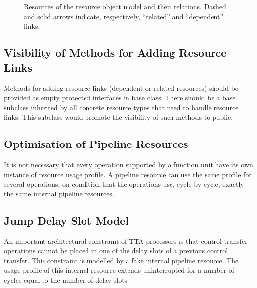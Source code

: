 \documentclass[a4paper,twoside]{tce}
\begin{document}
\begin{figure}[tb]
\centerline{}
\caption{Resources of the resource object model and their relations. Dashed
  and solid arrows indicate, respectively, ``related'' and ``dependent''
  links.}
  \label{fig:resource-graph}
\end{figure}


\subsection{Visibility of Methods for Adding Resource Links}

Methods for adding resource links (dependent or related resources) should be
provided as empty protected interfaces in base class. There should
be
%
%
a base subclass inherited by all concrete resource types that need to handle
resource links. This subclass would promote the visibility of such methods
to public.

\subsection{Optimisation of Pipeline Resources}

It is not necessary that every operation supported by a function unit have
its own instance of resource usage profile. A pipeline resource can use the
same profile for several operations, on condition that the operations use,
cycle by cycle, exactly the same internal pipeline resources.

\subsection{Jump Delay Slot Model}
\label{ssec:delay-slots}

An important architectural constraint of TTA processors is that control
transfer operations cannot be placed in one of the delay slots of a previous
control transfer. This constraint is modelled by a fake internal pipeline
resource. The usage profile of this internal resource extends uninterrupted
for a number of cycles equal to the number of delay slots.
\end{document}
